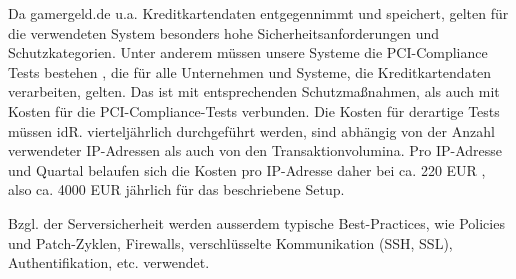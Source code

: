 Da gamergeld.de u.a. Kreditkartendaten entgegennimmt und speichert, gelten für
die verwendeten System besonders hohe Sicherheitsanforderungen und
Schutzkategorien. Unter anderem müssen unsere Systeme die PCI-Compliance Tests
bestehen \cite{PCI}, die für alle Unternehmen und Systeme, die
Kreditkartendaten verarbeiten, gelten. Das ist mit entsprechenden
Schutzmaßnahmen, als auch mit Kosten für die PCI-Compliance-Tests verbunden.
Die Kosten für derartige Tests müssen idR. vierteljährlich durchgeführt werden,
sind abhängig von der Anzahl verwendeter IP-Adressen als auch von den
Transaktionvolumina. Pro IP-Adresse und Quartal belaufen sich die Kosten pro
IP-Adresse daher bei ca. 220 EUR \cite{PCI:Costs}, also ca. 4000 EUR jährlich
für das beschriebene Setup.

Bzgl. der Serversicherheit werden ausserdem typische Best-Practices, wie
Policies und Patch-Zyklen, Firewalls, verschlüsselte Kommunikation (SSH, SSL),
Authentifikation, etc. verwendet.

